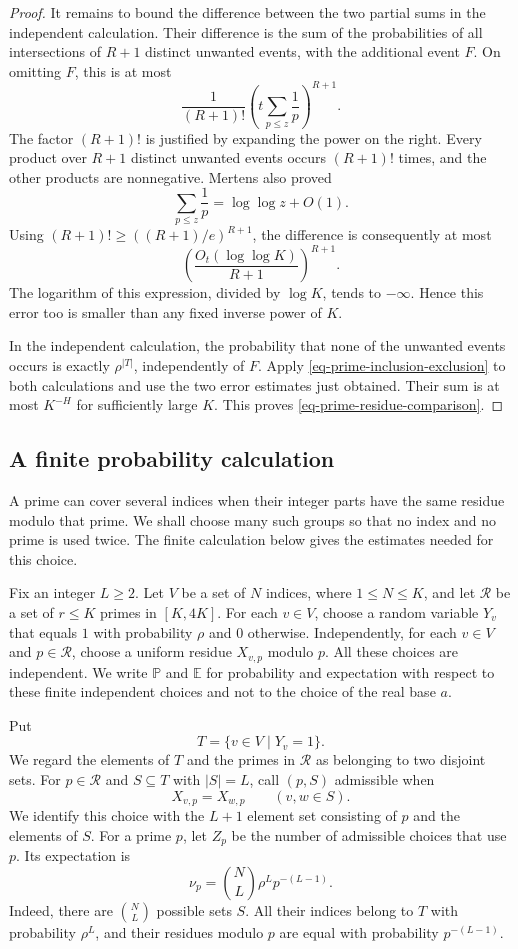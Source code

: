 \documentclass[11pt,reqno]{amsart}
\numberwithin{equation}{section}
\begin{document}
\begin{proof}
It remains to bound the difference between the two partial sums in the independent calculation. Their difference is the sum of the probabilities of all intersections of $R+1$ distinct unwanted events, with the additional event $F$. On omitting $F$, this is at most
\[
 \frac1{(R+1)!}
 \left(t\sum_{p\le z}\frac1p\right)^{R+1}.
\]
The factor $(R+1)!$ is justified by expanding the power on the right. Every product over $R+1$ distinct unwanted events occurs $(R+1)!$ times, and the other products are nonnegative. Mertens \cite{Mertens} also proved
\[
 \sum_{p\le z}\frac1p=\log\log z+O(1).
\]
Using $(R+1)!\ge((R+1)/e)^{R+1}$, the difference is consequently at most
\[
 \left(\frac{O_t(\log\log K)}{R+1}\right)^{R+1}.
\]
The logarithm of this expression, divided by $\log K$, tends to $-\infty$. Hence this error too is smaller than any fixed inverse power of $K$.

In the independent calculation, the probability that none of the unwanted events occurs is exactly $\rho^{|T|}$, independently of $F$. Apply \eqref{eq-prime-inclusion-exclusion} to both calculations and use the two error estimates just obtained. Their sum is at most $K^{-H}$ for sufficiently large $K$. This proves \eqref{eq-prime-residue-comparison}.
\end{proof}

\subsection{A finite probability calculation}

A prime can cover several indices when their integer parts have the same residue modulo that prime. We shall choose many such groups so that no index and no prime is used twice. The finite calculation below gives the estimates needed for this choice.

Fix an integer $L\ge2$. Let $V$ be a set of $N$ indices, where $1\le N\le K$, and let $\mathcal R$ be a set of $r\le K$ primes in $[K,4K]$. For each $v\in V$, choose a random variable $Y_v$ that equals $1$ with probability $\rho$ and $0$ otherwise. Independently, for each $v\in V$ and $p\in\mathcal R$, choose a uniform residue $X_{v,p}$ modulo $p$. All these choices are independent. We write $\mathbb P$ and $\mathbb E$ for probability and expectation with respect to these finite independent choices and not to the choice of the real base $a$.

Put
\[
 T=\{v\in V\mid Y_v=1\}.
\]
We regard the elements of $T$ and the primes in $\mathcal R$ as belonging to two disjoint sets. For $p\in\mathcal R$ and $S\subseteq T$ with $|S|=L$, call $(p,S)$ admissible when
\[
 X_{v,p}=X_{w,p}\qquad(v,w\in S).
\]
We identify this choice with the $L+1$ element set consisting of $p$ and the elements of $S$. For a prime $p$, let $Z_p$ be the number of admissible choices that use $p$. Its expectation is
\begin{equation}\label{eq-prime-fixed-prime-mean}
 \nu_p=\binom NL\rho^L p^{-(L-1)}.
\end{equation}
Indeed, there are $\binom NL$ possible sets $S$. All their indices belong to $T$ with probability $\rho^L$, and their residues modulo $p$ are equal with probability $p^{-(L-1)}$.
\end{document}
